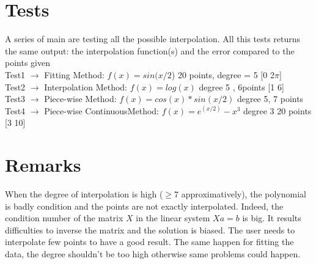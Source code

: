 \documentclass[12pt]{article}
\begin{document}
\section{Tests}
A series of main are testing all the possible interpolation. All this tests returns the same output: the interpolation function(s) and the error compared to the points given\\
Test1 $\rightarrow$ Fitting Method: $f(x) = sin(x/2$) 20 points, degree = 5 [0 2$\pi$]\\
Test2 $\rightarrow$ Interpolation Method: $f(x) = log(x)$ degree 5 , 6points [1 6]\\
Test3 $\rightarrow$ Piece-wise Method: $f(x) = cos(x)*sin(x/2)$ degree 5, 7 points\\
Test4 $\rightarrow$ Piece-wise ContinuousMethod: $f(x) = e^{(x/2)} -x^3$ degree 3 20 points [3 10]


\section{Remarks}
When the degree of interpolation is high ($\ge 7$ approximatively), the polynomial is badly condition and the points are not exactly interpolated. Indeed, the condition number of the matrix $X$ in the linear system $Xa=b$ is big. It results difficulties to inverse the matrix and the solution is biased. The user needs to interpolate few points to have a good result.
The same happen for fitting the data, the degree shouldn't be too high otherwise same problems could happen.



 
\end{document}
